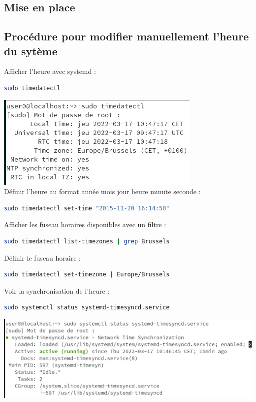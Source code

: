 \documentclass[a4paper]{article}
\begin{document}
\begin{adjustwidth}{-2cm}{-2cm}
 \newpage
\section{Mise en place}
\subsection {Procédure pour modifier manuellement l'heure du sytème}
\noindent Afficher l’heure avec systemd :
\begin{lstlisting}[language=bash]
  sudo timedatectl
\end{lstlisting}
\includegraphics[scale=0.6]{picture/3.png} \\

\noindent Définir l’heure au format année mois jour heure minute seconde :
\begin{lstlisting}[language=bash]
  sudo timedatectl set-time "2015-11-20 16:14:50"
\end{lstlisting}

\noindent Afficher les fuseau horaires disponibles avec un filtre :
\begin{lstlisting}[language=bash]
  sudo timedatectl list-timezones | grep Brussels
\end{lstlisting}

\noindent Définir le fuseau horaire :
\begin{lstlisting}[language=bash]
  sudo timedatectl set-timezone | Europe/Brussels
\end{lstlisting}

\noindent Voir la synchronisation de l'heure :
\begin{lstlisting}[language=bash]
  sudo systemctl status systemd-timesyncd.service
\end{lstlisting}
\includegraphics[scale=0.7]{picture/4.png} 
\newpage

\end{adjustwidth}
\end{document}
